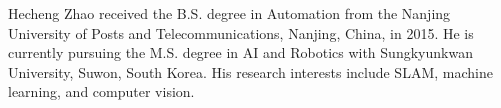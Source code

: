 \documentclass{ieeeaccess}
\begin{document}
%
%
%
%
%
%
%
%
%
%
%

\begin{IEEEbiography}{Hecheng Zhao} received the B.S. degree
in Automation from
the Nanjing University of Posts and Telecommunications,
Nanjing, China, in 2015. He is currently pursuing the M.S. degree in AI and Robotics with Sungkyunkwan University,
Suwon, South Korea.
His research interests include SLAM, machine learning, and computer vision.
\end{IEEEbiography}
\end{document}
